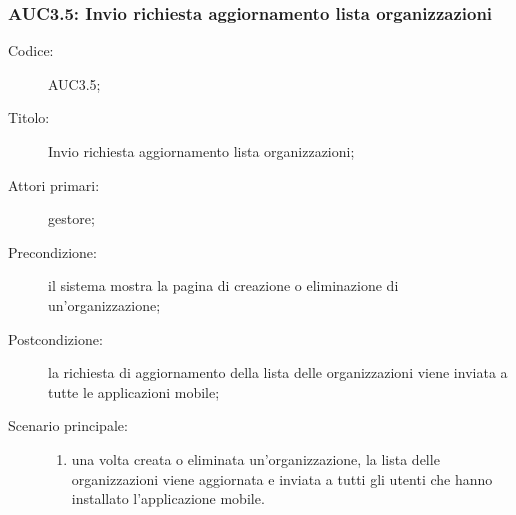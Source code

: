 \documentclass[../../../analisi-dei-requisiti.tex]{subfiles}
\begin{document}
\subsubsection{AUC3.5: Invio richiesta aggiornamento lista organizzazioni}%
\label{subs:AUC3.5}
\begin{description}
  \item[Codice:] AUC3.5;
  \item[Titolo:] Invio richiesta aggiornamento lista organizzazioni;
  \item[Attori primari:] gestore;
  \item[Precondizione:] il sistema mostra la pagina di creazione o eliminazione di un'organizzazione;
  \item[Postcondizione:] la richiesta di aggiornamento della lista delle organizzazioni viene inviata a tutte le applicazioni mobile;
  \item[Scenario principale:]
        \begin{enumerate}
          \item una volta creata o eliminata un'organizzazione, la lista delle organizzazioni viene aggiornata e inviata a tutti gli utenti che hanno installato l'applicazione mobile.
        \end{enumerate}
\end{description}
\end{document}

